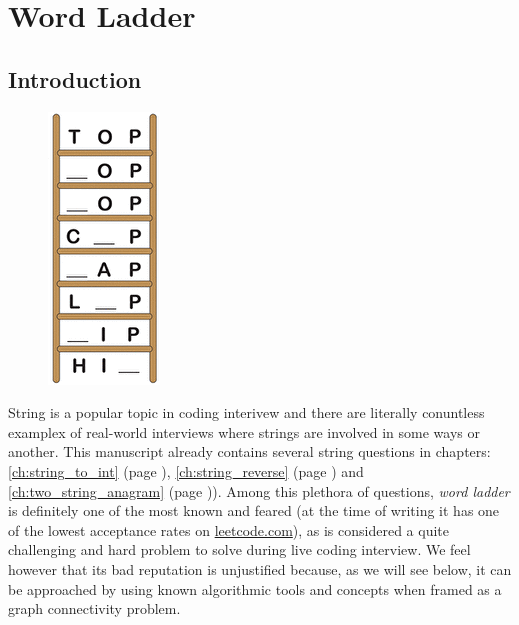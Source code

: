 %



\chapter{Word Ladder}
\label{ch:word_ladder}
\section*{Introduction}
\begin{figure}
    \vspace{-30pt}
    \begin{center}
        \includegraphics[scale=0.5]{sources/word_ladder/images/top-word-ladder}
    \end{center}
  \end{figure}
String is a popular topic in coding interivew and there are literally conuntless examplex of real-world interviews where strings are involved in some ways or another.
This manuscript already contains several string questions in chapters: \ref{ch:string_to_int} (page \pageref{ch:string_to_int}), \ref{ch:string_reverse} (page \pageref{ch:string_reverse}) and \ref{ch:two_string_anagram} (page \pageref{ch:two_string_anagram})).
Among this plethora of questions, \textit{word ladder} is definitely one of the most known and feared (at the time of writing it has one of the lowest acceptance rates on \href{https://leetcode.com/problems/word-ladder/}{leetcode.com}), as is considered a quite challenging and hard problem to solve during live coding interview. 
We feel however that its bad reputation is unjustified because, as we will see below, it can be approached by using known algorithmic tools and concepts when framed as a graph connectivity problem.


